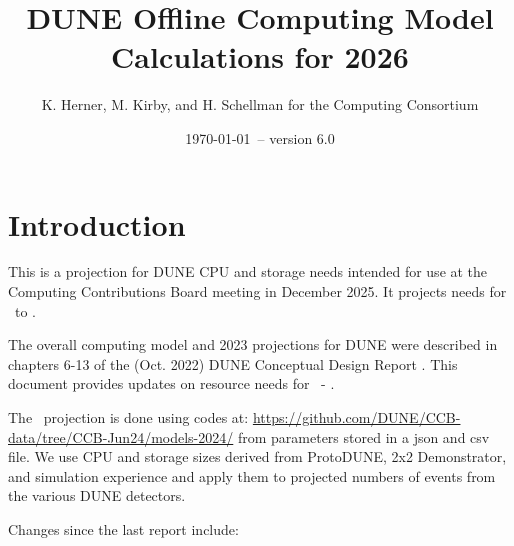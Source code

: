 \documentclass[12pt]{article}
\title{DUNE Offline Computing Model Calculations for 2026}
\author{K. Herner, M. Kirby, and H. Schellman for the Computing Consortium}
\date{\today\ -- version 6.0 }
\newcommand{\csvautotabularright}[2][]{\csvloop{autotabularright={#2},#1}}
\begin{document}
\makeatletter

\maketitle

\tableofcontents
\newpage
\listoftables
\listoffigures

\section{Introduction}

This is a projection for DUNE CPU and storage needs intended for use at the Computing Contributions Board meeting in December 2025. It projects needs for \configRequestYear\ to \configMaxYear. 

The overall computing model  and 2023 projections for DUNE were described in chapters 6-13 of the  (Oct. 2022) DUNE Conceptual Design Report \cite{DUNE:2022fcw}.   This document provides updates on resource needs for \configRequestYear\ - \configMaxYear. 

The \configRequestYear\ projection is done using codes at: \href{https://github.com/DUNE/CCB-data/tree/CCB-Jun24/models-2024/}{https://github.com/DUNE/CCB-data/tree/CCB-Jun24/models-2024/} from parameters stored in a json and csv file. We use CPU and storage sizes derived from ProtoDUNE, 2x2 Demonstrator, and simulation experience and apply them to projected numbers of events from the various DUNE detectors. 







Changes since the last report \cite{CCB2025, CCB2024Report, CCB2024Minutes} include:
\end{document}
